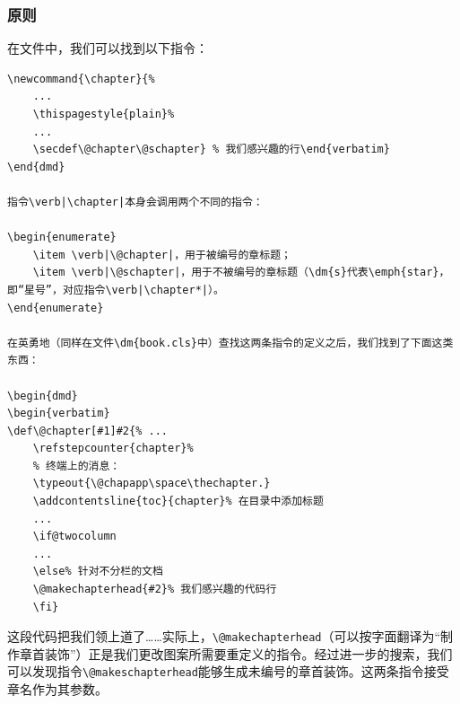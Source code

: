 \subsubsection{原则}

在文件中，我们可以找到以下指令：

\begin{dmd}
\begin{verbatim}
\newcommand{\chapter}{% 
    ...
    \thispagestyle{plain}%
    ...
    \secdef\@chapter\@schapter} % 我们感兴趣的行\end{verbatim}
\end{dmd}

指令\verb|\chapter|本身会调用两个不同的指令：

\begin{enumerate}
    \item \verb|\@chapter|，用于被编号的章标题；
    \item \verb|\@schapter|，用于不被编号的章标题（\dm{s}代表\emph{star}，即“星号”，对应指令\verb|\chapter*|）。
\end{enumerate}

在英勇地（同样在文件\dm{book.cls}中）查找这两条指令的定义之后，我们找到了下面这类东西：

\begin{dmd}
\begin{verbatim}
\def\@chapter[#1]#2{% ...
    \refstepcounter{chapter}%
    % 终端上的消息：
    \typeout{\@chapapp\space\thechapter.} 
    \addcontentsline{toc}{chapter}% 在目录中添加标题
    ...
    \if@twocolumn
    ...
    \else% 针对不分栏的文档
    \@makechapterhead{#2}% 我们感兴趣的代码行
    \fi}\end{verbatim}
\end{dmd}

这段代码把我们领上道了……实际上，\verb+\@makechapterhead+（可以按字面翻译为“制作章首装饰”）正是我们更改图案所需要重定义的指令。经过进一步的搜索，我们可以发现指令\verb|\@makeschapterhead|能够生成未编号的章首装饰。这两条指令接受章名作为其参数。

